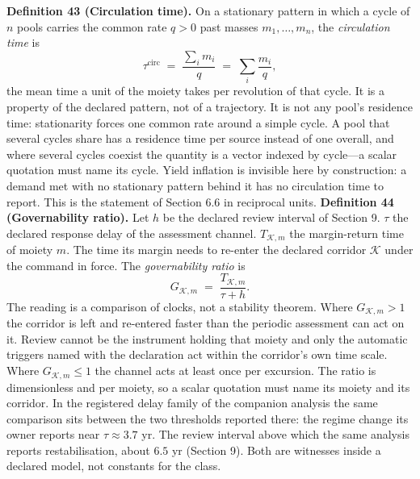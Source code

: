 \documentclass[11pt]{article}
\begin{document}
\textbf{Definition 43 (Circulation time).} On a stationary pattern in which a cycle of \(n\) pools carries the common rate \(q > 0\) past masses \(m_1, \dots, m_n\), the \emph{circulation time} is \[ \tau^{\mathrm{circ}} \;=\; \frac{\sum_i m_i}{q} \;=\; \sum_i \frac{m_i}{q} , \] the mean time a unit of the moiety takes per revolution of that cycle. It is a property of the declared pattern, not of a trajectory. It is not any pool's residence time: stationarity forces one common rate around a simple cycle. A pool that several cycles share has a residence time per source instead of one overall, and where several cycles coexist the quantity is a vector indexed by cycle---a scalar quotation must name its cycle. Yield inflation is invisible here by construction: a demand met with no stationary pattern behind it has no circulation time to report. This is the statement of Section 6.6 in reciprocal units. \textbf{Definition 44 (Governability ratio).} Let \(h\) be the declared review interval of Section 9. \(\tau\) the declared response delay of the assessment channel. \(T_{\mathcal{K},m}\) the margin-return time of moiety \(m\). The time its margin needs to re-enter the declared corridor \(\mathcal K\) under the command in force. The \emph{governability ratio} is \[ G_{\mathcal{K},m} \;=\; \frac{T_{\mathcal{K},m}}{\tau + h} . \] The reading is a comparison of clocks, not a stability theorem. Where \(G_{\mathcal{K},m} > 1\) the corridor is left and re-entered faster than the periodic assessment can act on it. Review cannot be the instrument holding that moiety and only the automatic triggers named with the declaration act within the corridor's own time scale. Where \(G_{\mathcal{K},m} \le 1\) the channel acts at least once per excursion. The ratio is dimensionless and per moiety, so a scalar quotation must name its moiety and its corridor. In the registered delay family of the companion analysis the same comparison sits between the two thresholds reported there: the regime change its owner reports near \(\tau \approx 3.7\) yr. The review interval above which the same analysis reports restabilisation, about \(6.5\) yr (Section 9). Both are witnesses inside a declared model, not constants for the class.
\end{document}
